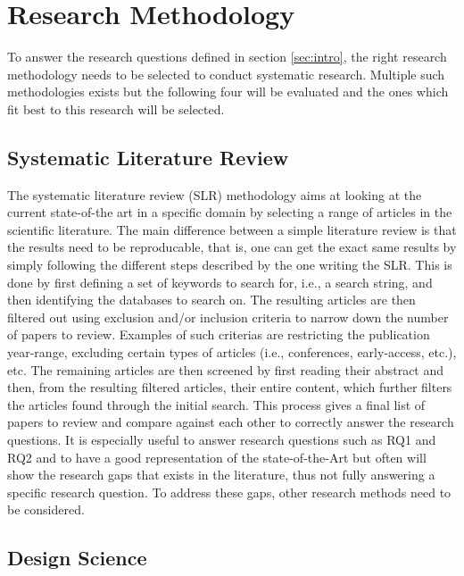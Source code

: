 
\section{Research Methodology}
\label{sec:methodology}

To answer the research questions defined in section \ref{sec:intro},
the right research methodology needs to be selected to conduct 
systematic research.
Multiple such methodologies exists but the following four will be evaluated
and the ones which fit best to this research will be selected.

\subsection{Systematic Literature Review}

The systematic literature review (SLR) methodology aims at
looking at the current state-of-the art in a specific domain by selecting a range 
of articles in the scientific literature\cite{KITCHENHAM2009SLR}.
The main difference between a simple literature review is that the results need to be reproducable,
that is, one can get the exact same results by simply following the different steps described by the one writing the SLR.
This is done by first defining a set of keywords to search for, i.e., a search string, 
and then identifying the databases to search on.
The resulting articles are then filtered out using exclusion and/or inclusion criteria
to narrow down the number of papers to review.
Examples of such criterias are restricting the publication year-range,
excluding certain types of articles (i.e., conferences, early-access, etc.), etc.
The remaining articles are then screened by first reading 
their abstract and then, from the resulting filtered articles, their entire content,
which further filters the articles found through the initial search.
This process gives a final list of papers to review and compare against each other 
to correctly answer the research questions. 
It is especially useful to answer research questions such as RQ1 and RQ2
and to have a good representation of the state-of-the-Art
but often will show the research gaps that exists in the literature,
thus not fully answering a specific research question.
To address these gaps, other research methods need to be considered.

\subsection{Design Science}

